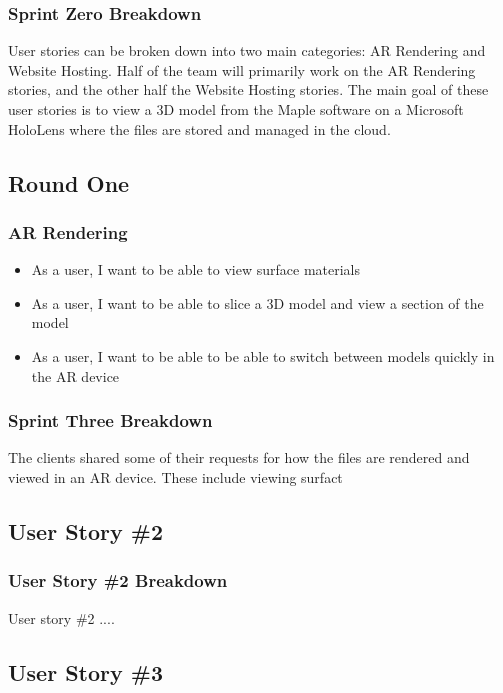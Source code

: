 \subsubsection{Sprint Zero Breakdown}
User stories can be broken down into two main categories: AR Rendering and Website Hosting.  Half of the team will primarily work on
the AR Rendering stories, and the other half the Website Hosting stories.  The main goal of these user stories is to view a
3D model from the Maple software on a Microsoft HoloLens where the files are stored and managed in the cloud.

\subsection{Round One}

\subsubsection{AR Rendering}

\begin{itemize}
	\item As a user, I want to be able to view surface materials
	\item As a user, I want to be able to slice a 3D model and view a section of the model
	\item As a user, I want to be able to be able to switch between models quickly in the AR device
\end{itemize}

\subsubsection{Sprint Three Breakdown}

The clients shared some of their requests for how the files are rendered and viewed in an AR device.  These include viewing surfact

\subsection{User Story \#2}

\subsubsection{User Story \#2 Breakdown}
User story \#2  ....

\subsection{User Story \#3}

